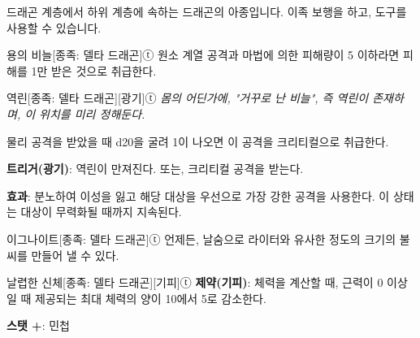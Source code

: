 \documentclass{report}
\begin{document}
	드래곤 계층에서 하위 계층에 속하는 드래곤의 아종입니다. 이족 보행을 하고, 도구를 사용할 수 있습니다.
	
	\begin{story}{용의 비늘}{[종족: 델타 드래곤]ⓣ}
		원소 계열 공격과 마법에 의한 피해량이 5 이하라면 피해를 1만 받은 것으로 취급한다.
		
	\end{story}
	
	\begin{story}{역린}{[종족: 델타 드래곤][광기]ⓣ}
		\textit{몸의 어딘가에, "거꾸로 난 비늘", 즉 \emph{역린}이 존재하며, 이 위치를 미리 정해둔다.}
		
		물리 공격을 받았을 때 d20을 굴려 1이 나오면 이 공격을 크리티컬으로 취급한다.
		
		\textbf{트리거(광기)}: 역린이 만져진다. 또는, 크리티컬 공격을 받는다.
		
		\textbf{효과}: 분노하여 이성을 잃고 해당 대상을 우선으로 가장 강한 공격을 사용한다. 이 상태는 대상이 무력화될 때까지 지속된다.
		
	\end{story}
	
	\begin{story}{이그나이트}{[종족: 델타 드래곤]ⓣ}
		언제든, 날숨으로 라이터와 유사한 정도의 크기의 불씨를 만들어 낼 수 있다.
		
	\end{story}
	
	\begin{story}{날렵한 신체}{[종족: 델타 드래곤][기피]ⓣ}
		\textbf{제약(기피)}: 체력을 계산할 때, 근력이 0 이상일 때 제공되는 최대 체력의 양이 10에서 5로 감소한다.
		
		\textbf{스탯 +}: 민첩
		
	\end{story}
\end{document}
